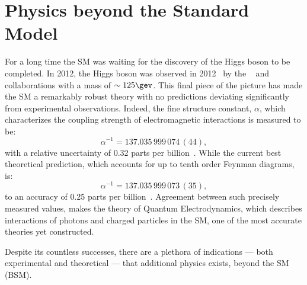 \section{Physics beyond the Standard Model}
\label{sec:bsm}

For a long time the SM was waiting for the discovery of the Higgs boson to be completed.
In 2012, the Higgs boson was observed in 2012~\cite{Chatrchyan:2012ufa,Aad:2012tfa} by the
\cms~\cite{Chatrchyan:2012ufa} and \atlas~\cite{Aad:2012tfa} collaborations with a mass of
$\sim125\gev$.
This final piece of the picture has made the SM a remarkably robust theory with no predictions
deviating significantly from experimental observations.
Indeed, the fine structure constant, $\alpha$, which characterizes the coupling strength of
electromagnetic interactions
is measured to be:
\begin{equation}
  \alpha^{-1} = 137.035\,999\,074\,(44),
\end{equation}
with a relative uncertainty of 0.32 parts per billion~\cite{PDG2012}.
While the current best theoretical prediction, which accounts for up to tenth order Feynman
diagrams, is:
\begin{equation}
  \alpha^{-1} = 137.035\,999\,073\,(35),
\end{equation}
to an accuracy of 0.25 parts per billion~\cite{Aoyama:2012wj}.
Agreement between such precisely measured values, makes the theory of Quantum Electrodynamics,
which describes interactions of photons and charged particles in the SM, one of the most accurate
theories yet constructed.

Despite its countless successes, there are a plethora of indications --- both
experimental and theoretical --- that additional physics exists, beyond the SM (BSM).




